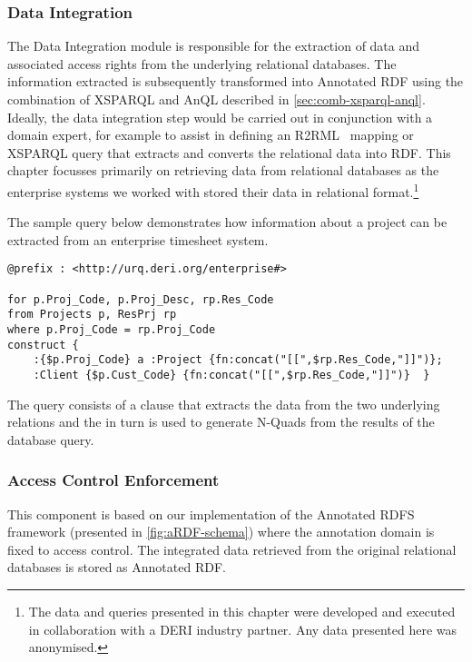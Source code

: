 \subsubsection{Data Integration}
%
The Data Integration module is responsible for the extraction of data and associated access rights from the underlying
relational databases.  The information extracted is subsequently transformed into Annotated \ac{RDF} using the
combination of XSPARQL and AnQL described in \cref{sec:comb-xsparql-anql}.
%
Ideally, the data integration step would be carried out in conjunction with a domain expert, for example to assist in
defining an R2RML~\cite{DasSundaraCyganiak:2011aa} mapping or XSPARQL query that extracts and converts the relational
data into \ac{RDF}.
%
This chapter focusses primarily on retrieving data from relational databases as the enterprise systems we worked with
stored their data in relational format.\footnote{The data and queries presented in this chapter were developed and
  executed in collaboration with a DERI industry partner.  Any data presented here was anonymised.}


\begin{example}
\label{fig:xsparql-query}

The sample query below demonstrates how information about a project can be extracted from an enterprise timesheet
system.
%
\begin{lstlisting}[basicstyle=\tt\scriptsize,frame=none, numbers=none]
@prefix : <http://urq.deri.org/enterprise#> 
	
for p.Proj_Code, p.Proj_Desc, rp.Res_Code 
from Projects p, ResPrj rp
where p.Proj_Code = rp.Proj_Code
construct { 
	:{$p.Proj_Code} a :Project {fn:concat("[[",$rp.Res_Code,"]]")};
	:Client {$p.Cust_Code} {fn:concat("[[",$rp.Res_Code,"]]")}  } 
\end{lstlisting}
%
The query consists of a \SQLForClause clause that extracts the data from the two underlying relations and the
\ConstructClause in turn is used to generate N-Quads from the results of the database query.

\end{example}


\subsubsection{Access Control Enforcement}

This component is based on our implementation of the Annotated RDFS framework (presented in \cref{fig:aRDF-schema})
where the annotation domain is fixed to access control.
% 
The integrated data retrieved from the original relational databases is stored as Annotated RDF.
%

